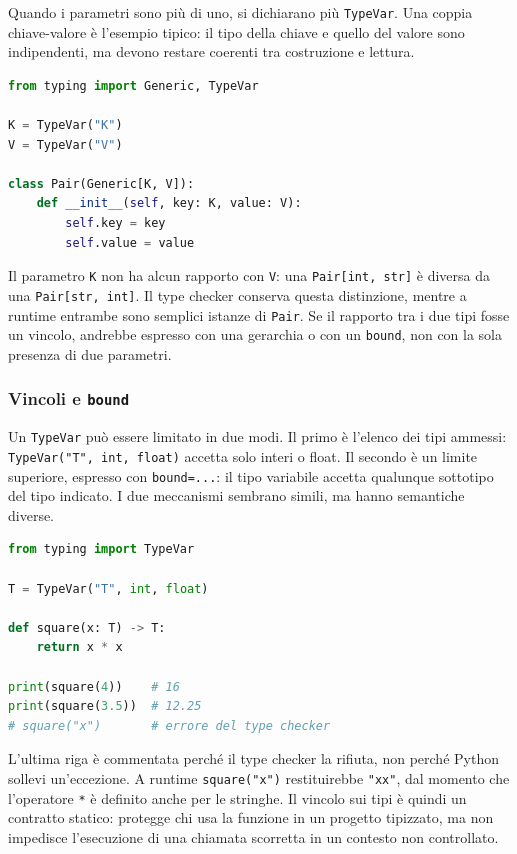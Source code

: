 \documentclass[12pt]{extarticle}
\begin{document}
\noindent Quando i parametri sono più di uno, si dichiarano più \texttt{TypeVar}. Una coppia chiave-valore è l'esempio tipico: il tipo della chiave e quello del valore sono indipendenti, ma devono restare coerenti tra costruzione e lettura.

\begin{lstlisting}[language=Python]
from typing import Generic, TypeVar

K = TypeVar("K")
V = TypeVar("V")

class Pair(Generic[K, V]):
    def __init__(self, key: K, value: V):
        self.key = key
        self.value = value
\end{lstlisting}

\noindent Il parametro \texttt{K} non ha alcun rapporto con \texttt{V}: una \texttt{Pair[int, str]} è diversa da una \texttt{Pair[str, int]}. Il type checker conserva questa distinzione, mentre a runtime entrambe sono semplici istanze di \texttt{Pair}. Se il rapporto tra i due tipi fosse un vincolo, andrebbe espresso con una gerarchia o con un \texttt{bound}, non con la sola presenza di due parametri.

\subsubsection{Vincoli e \texttt{bound}}

\noindent Un \texttt{TypeVar} può essere limitato in due modi. Il primo è l'elenco dei tipi ammessi: \texttt{TypeVar("T", int, float)} accetta solo interi o float. Il secondo è un limite superiore, espresso con \texttt{bound=...}: il tipo variabile accetta qualunque sottotipo del tipo indicato. I due meccanismi sembrano simili, ma hanno semantiche diverse.

\begin{lstlisting}[language=Python]
from typing import TypeVar

T = TypeVar("T", int, float)

def square(x: T) -> T:
    return x * x

print(square(4))    # 16
print(square(3.5))  # 12.25
# square("x")       # errore del type checker
\end{lstlisting}

\noindent L'ultima riga è commentata perché il type checker la rifiuta, non perché Python sollevi un'eccezione. A runtime \texttt{square("x")} restituirebbe \texttt{"xx"}, dal momento che l'operatore \texttt{*} è definito anche per le stringhe. Il vincolo sui tipi è quindi un contratto statico: protegge chi usa la funzione in un progetto tipizzato, ma non impedisce l'esecuzione di una chiamata scorretta in un contesto non controllato.
\end{document}
